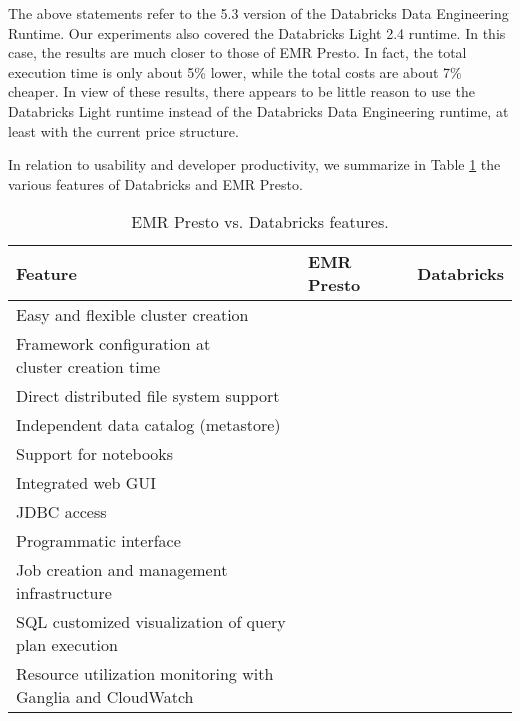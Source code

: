 The above statements refer to the 5.3 version of the Databricks Data Engineering Runtime. Our experiments also covered the Databricks Light 2.4 runtime. In this case, the results are much closer to those of EMR Presto. In fact, the total execution time is only about 5\% lower, while the total costs are about 7\% cheaper. In view of these results, there appears to be little reason to use the Databricks Light runtime instead of the Databricks Data Engineering runtime, at least with the current price structure.

In relation to usability and developer productivity, we summarize in Table \ref{table:comparisonFeatures} the various features of Databricks and EMR Presto.

\begin{table}
  \centering
	\begin{tabular}{|l|l|l|}
	  \hline
		\textbf{Feature} & \textbf{EMR Presto} & \textbf{Databricks} \\ \hline
		Easy and flexible cluster creation & \cmark & \cmark \\ \hline
		\makecell[l]{Framework configuration at \\ cluster creation time} & \cmark & \cmark \\ \hline
		Direct distributed file system support & \xmark & \cmark \\ \hline
		Independent data catalog (metastore) & \cmark & \cmark \\ \hline
		Support for notebooks & \cmark & \cmark \\ \hline
		Integrated web GUI & \xmark & \cmark \\ \hline
		JDBC access & \cmark & \cmark \\ \hline
		Programmatic interface & \xmark & \cmark \\ \hline
		Job creation and management infrastructure & \xmark & \cmark \\ \hline
		\makecell[l]{SQL customized visualization of query \\ plan execution} & \cmark & \cmark \\ \hline
		\makecell[l]{Resource utilization monitoring with \\ Ganglia and CloudWatch} & \cmark & \cmark \\ \hline
	\end{tabular}
	\caption{EMR Presto vs. Databricks features.}
	\label{table:comparisonFeatures}
\end{table}

